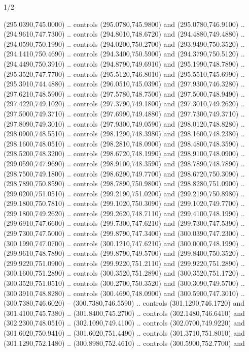 \begin{flagdescription}{1/2}
\begin{scope}[xshift=0.5\flaglength]
\begin{scope}[scale=0.00745\flagwidth,xshift=-12.1mm,yshift=41.7mm]
\begin{scope}[y=0.80pt, x=0.80pt, yscale=-1, xscale=1, inner sep=0pt, outer sep=0pt]
\begin{scope}[cm={{1.33333,0.0,0.0,-1.33333,(0.0,114.66667)}}]
\begin{scope}[scale=0.100]
  (295.0390,745.0000) .. controls (295.0780,745.9800) and (295.0780,746.9100) ..
  (294.9610,747.7300) .. controls (294.8010,748.6720) and (294.4880,749.4880) ..
  (294.0590,750.1990) .. controls (294.0200,750.2700) and (293.9490,750.3520) ..
  (294.1410,750.4690) .. controls (294.3400,750.5900) and (294.3790,750.5120) ..
  (294.4490,750.3910) .. controls (294.8790,749.6910) and (295.1990,748.7890) ..
  (295.3520,747.7700) .. controls (295.5120,746.8010) and (295.5510,745.6990) ..
  (295.3910,744.4880) .. controls (296.0510,745.0390) and (297.9300,746.3280) ..
  (297.6210,748.5900) .. controls (297.5780,748.7500) and (297.5000,748.9490) ..
  (297.4220,749.1020) .. controls (297.3790,749.1800) and (297.3010,749.2620) ..
  (297.5000,749.3710) .. controls (297.6990,749.4880) and (297.7300,749.3710) ..
  (297.8090,749.3010) .. controls (297.9300,749.0590) and (298.0120,748.8280) ..
  (298.0900,748.5510) .. controls (298.1290,748.3980) and (298.1600,748.2380) ..
  (298.1600,748.0510) .. controls (298.2810,748.0900) and (298.4800,748.3590) ..
  (298.5200,748.3200) .. controls (298.6720,748.1990) and (298.9100,748.0900) ..
  (299.0590,747.9690) .. controls (298.9100,748.3590) and (298.7890,748.7890) ..
  (298.7500,749.1800) .. controls (298.6290,749.7700) and (298.6720,750.3090) ..
  (298.7890,750.8590) .. controls (298.7890,750.9800) and (298.8280,751.0900) ..
  (299.0200,751.0510) .. controls (299.2190,751.0200) and (299.2190,750.8980) ..
  (299.1800,750.7810) .. controls (299.1020,750.3090) and (299.1020,749.7700) ..
  (299.1800,749.2620) .. controls (299.2620,748.7110) and (299.4100,748.1990) ..
  (299.6910,747.6600) .. controls (299.7300,747.6210) and (299.7300,747.5390) ..
  (299.7300,747.5000) .. controls (299.8790,747.3400) and (300.0390,747.2300) ..
  (300.1990,747.0700) .. controls (300.1210,747.6210) and (300.0000,748.1990) ..
  (299.9610,748.7890) .. controls (299.8790,749.5700) and (299.8400,750.3520) ..
  (299.9220,751.0900) .. controls (299.9220,751.2110) and (299.9220,751.2890) ..
  (300.1600,751.2890) .. controls (300.3520,751.2890) and (300.3520,751.1720) ..
  (300.3520,751.0510) .. controls (300.2700,750.3520) and (300.3090,749.5700) ..
  (300.3910,748.8280) .. controls (300.4690,748.0900) and (300.5900,747.3010) ..
  (300.7380,746.6020) -- (300.7380,746.5590) .. controls (301.1290,746.1720) and
  (301.4100,745.7380) .. (301.8400,745.2700) .. controls (302.1480,746.6410) and
  (302.2300,748.0510) .. (302.1090,749.4100) .. controls (302.0700,749.9220) and
  (301.6020,750.9410) .. (301.6020,751.4490) .. controls (301.3710,751.8010) and
  (301.1290,752.1480) .. (300.8980,752.4610) .. controls (300.5900,752.7700) and

\end{scope}
\end{scope}
\end{scope}
\end{scope}
\end{scope}
\end{flagdescription}
